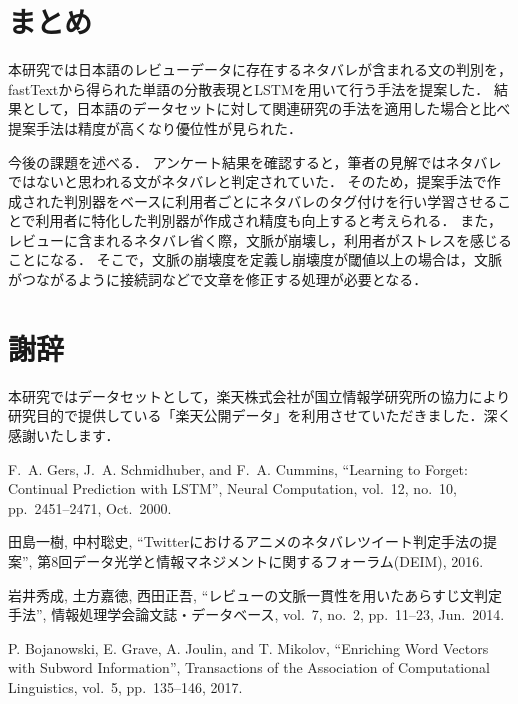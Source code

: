 \documentclass[autodetect-engine,dvipdfmx-if-dvi,ja=standard,a4j,jbase=10.5pt,twoside,twocolumn,magstyle=nomag*]{bxjsarticle}
\begin{document}
\section{まとめ}
本研究では日本語のレビューデータに存在するネタバレが含まれる文の判別を，fastTextから得られた単語の分散表現とLSTMを用いて行う手法を提案した．
結果として，日本語のデータセットに対して関連研究の手法を適用した場合と比べ提案手法は精度が高くなり優位性が見られた．

今後の課題を述べる．
アンケート結果を確認すると，筆者の見解ではネタバレではないと思われる文がネタバレと判定されていた．
そのため，提案手法で作成された判別器をベースに利用者ごとにネタバレのタグ付けを行い学習させることで利用者に特化した判別器が作成され精度も向上すると考えられる．
また，レビューに含まれるネタバレ省く際，文脈が崩壊し，利用者がストレスを感じることになる．
そこで，文脈の崩壊度を定義し崩壊度が閾値以上の場合は，文脈がつながるように接続詞などで文章を修正する処理が必要となる．

\section*{謝辞}
本研究ではデータセットとして，楽天株式会社が国立情報学研究所の協力により研究目的で提供している「楽天公開データ」を利用させていただきました．深く感謝いたします．

\begin{thebibliography}{9}

  F.~A. Gers, J.~A. Schmidhuber, and F.~A. Cummins, ``Learning to Forget: Continual Prediction with LSTM'', Neural Computation, vol.~12, no.~10, pp.~2451--2471, Oct.\ 2000.

  田島一樹, 中村聡史, ``Twitterにおけるアニメのネタバレツイート判定手法の提案'', 第8回データ光学と情報マネジメントに関するフォーラム(DEIM), 2016.

  岩井秀成, 土方嘉徳, 西田正吾, ``レビューの文脈一貫性を用いたあらすじ文判定手法'', 情報処理学会論文誌・データベース, vol.~7, no.~2, pp.~11--23, Jun.\ 2014.

  P. Bojanowski, E. Grave, A. Joulin, and T. Mikolov, ``Enriching Word Vectors with Subword Information'', Transactions of the Association of Computational Linguistics, vol.~5, pp.~135--146, 2017.

\end{thebibliography}
\end{document}
